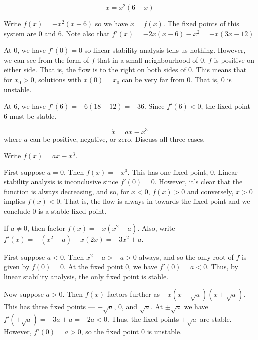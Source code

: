 \documentclass[12 pt, letterpaper]{hmcpset}
\begin{document}
\begin{problem}[Strogatz 2.4.4]
	\[
		\dot{x} = x^{2}(6 - x)
	\]
\end{problem}

\begin{solution}
	Write $f(x) = - x^{2} (x - 6)$ so we have $\dot{x} = f(x)$. The fixed points of this system are $0$ and $6$. Note also that $f'(x) = - 2x(x - 6) - x^{2} = -x(3x - 12)$

	At $0$, we have $f'(0) = 0$ so linear stability analysis tells us nothing. However, we can see from the form of $f$ that in a small neighbourhood of $0$, $f$ is positive on either side. That is, the flow is to the right on both sides of $0$. This means that for $x_{0} > 0$, solutions with $x(0) = x_{0}$ can be very far from $0$. That is, $0$ is unstable.

	At $6$, we have $f'(6) = -6(18 - 12) = -36$. Since $f'(6) < 0$, the fixed point $6$ must be stable.
\end{solution}

\begin{problem}[Strogatz 2.4.7]
\[
	\dot{x} = ax - x^{3}
\]
where $a$ can be positive, negative, or zero. Discuss all three cases.
\end{problem}

\begin{solution}
	Write $f(x) = ax - x^{3}$.

	First suppose $a = 0$. Then $f(x) = - x^{3}$. This has one fixed point, $0$. Linear stability analysis is inconclusive since $f'(0) = 0$. However, it's clear that the function is always decreasing, and so, for $x < 0$, $f(x) > 0$ and conversely, $x > 0$ implies $f(x) < 0$. That is, the flow is always in towards the fixed point and we conclude $0$ is a stable fixed point.
	
	If $a \neq 0$, then factor $f(x) = -x(x^{2} - a)$. Also, write $f'(x) = - (x^{2} - a) - x(2x) = -3x^{2} + a$.

	First suppose $a < 0$. Then $x^{2} - a > -a > 0$ always, and so the only root of $f$ is given by $f(0) = 0$. At the fixed point $0$, we have $f'(0) = a < 0$. Thus, by linear stability analysis, the only fixed point is stable.

	Now suppose $a > 0$. Then $f(x)$ factors further as $-x(x - \sqrt{a})(x + \sqrt{a})$. This has three fixed points --- $-\sqrt{a}$, $0$, and $\sqrt{a}$. At $\pm \sqrt{a}$ we have $f'(\pm \sqrt{a}) = - 3a + a = -2 a < 0$. Thus, the fixed points $\pm \sqrt{a}$ are stable. However, $f'(0) = a > 0$, so the fixed point $0$ is unstable.
\end{solution}
\end{document}
